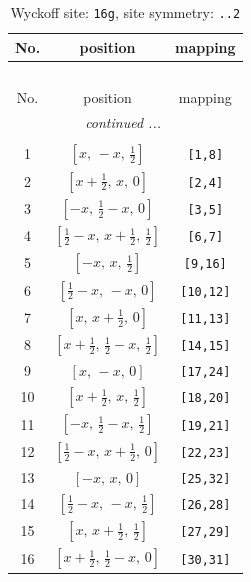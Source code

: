 \documentclass[fleqn,8pt]{jsarticle}
\begin{document}
\begin{longtable}{ccc}
\caption{Wyckoff site: {\tt 16g}, site symmetry: {\tt ..2}}
 \\
 \hline \hline
No. & position & mapping \\ \hline \endfirsthead

\multicolumn{2}{l}{\tablename\ \thetable{}} \\
 \hline \hline
No. & position & mapping \\ \hline \endhead

 \hline \hline
\multicolumn{2}{r}{\footnotesize\it continued ...} \\ \endfoot

 \hline \hline
\multicolumn{2}{r}{} \\ \endlastfoot

1 & $\left[ x,\, - x,\, \frac{1}{2} \right]$ & {\tt [1,8]} \\ \hline
2 & $\left[ x + \frac{1}{2},\, x,\, 0 \right]$ & {\tt [2,4]} \\ \hline
3 & $\left[ - x,\, \frac{1}{2} - x,\, 0 \right]$ & {\tt [3,5]} \\ \hline
4 & $\left[ \frac{1}{2} - x,\, x + \frac{1}{2},\, \frac{1}{2} \right]$ & {\tt [6,7]} \\ \hline
5 & $\left[ - x,\, x,\, \frac{1}{2} \right]$ & {\tt [9,16]} \\ \hline
6 & $\left[ \frac{1}{2} - x,\, - x,\, 0 \right]$ & {\tt [10,12]} \\ \hline
7 & $\left[ x,\, x + \frac{1}{2},\, 0 \right]$ & {\tt [11,13]} \\ \hline
8 & $\left[ x + \frac{1}{2},\, \frac{1}{2} - x,\, \frac{1}{2} \right]$ & {\tt [14,15]} \\ \hline
9 & $\left[ x,\, - x,\, 0 \right]$ & {\tt [17,24]} \\ \hline
10 & $\left[ x + \frac{1}{2},\, x,\, \frac{1}{2} \right]$ & {\tt [18,20]} \\ \hline
11 & $\left[ - x,\, \frac{1}{2} - x,\, \frac{1}{2} \right]$ & {\tt [19,21]} \\ \hline
12 & $\left[ \frac{1}{2} - x,\, x + \frac{1}{2},\, 0 \right]$ & {\tt [22,23]} \\ \hline
13 & $\left[ - x,\, x,\, 0 \right]$ & {\tt [25,32]} \\ \hline
14 & $\left[ \frac{1}{2} - x,\, - x,\, \frac{1}{2} \right]$ & {\tt [26,28]} \\ \hline
15 & $\left[ x,\, x + \frac{1}{2},\, \frac{1}{2} \right]$ & {\tt [27,29]} \\ \hline
16 & $\left[ x + \frac{1}{2},\, \frac{1}{2} - x,\, 0 \right]$ & {\tt [30,31]} \\
\end{longtable}
\end{document}

